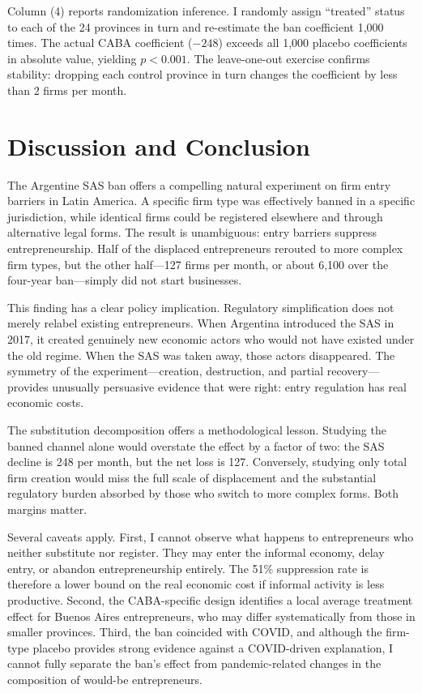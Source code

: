 \documentclass[12pt]{article}
\begin{document}
Column (4) reports randomization inference. I randomly assign ``treated'' status to each of the 24 provinces in turn and re-estimate the ban coefficient 1,000 times. The actual CABA coefficient ($-248$) exceeds all 1,000 placebo coefficients in absolute value, yielding $p < 0.001$. The leave-one-out exercise confirms stability: dropping each control province in turn changes the coefficient by less than 2 firms per month.


\section{Discussion and Conclusion}

The Argentine SAS ban offers a compelling natural experiment on firm entry barriers in Latin America. A specific firm type was effectively banned in a specific jurisdiction, while identical firms could be registered elsewhere and through alternative legal forms. The result is unambiguous: entry barriers suppress entrepreneurship. Half of the displaced entrepreneurs rerouted to more complex firm types, but the other half---127 firms per month, or about 6,100 over the four-year ban---simply did not start businesses.

This finding has a clear policy implication. Regulatory simplification does not merely relabel existing entrepreneurs. When Argentina introduced the SAS in 2017, it created genuinely new economic actors who would not have existed under the old regime. When the SAS was taken away, those actors disappeared. The symmetry of the experiment---creation, destruction, and partial recovery---provides unusually persuasive evidence that \citet{djankov2002regulation} were right: entry regulation has real economic costs.

The substitution decomposition offers a methodological lesson. Studying the banned channel alone would overstate the effect by a factor of two: the SAS decline is 248 per month, but the net loss is 127. Conversely, studying only total firm creation would miss the full scale of displacement and the substantial regulatory burden absorbed by those who switch to more complex forms. Both margins matter.

Several caveats apply. First, I cannot observe what happens to entrepreneurs who neither substitute nor register. They may enter the informal economy, delay entry, or abandon entrepreneurship entirely. The 51\% suppression rate is therefore a lower bound on the real economic cost if informal activity is less productive. Second, the CABA-specific design identifies a local average treatment effect for Buenos Aires entrepreneurs, who may differ systematically from those in smaller provinces. Third, the ban coincided with COVID, and although the firm-type placebo provides strong evidence against a COVID-driven explanation, I cannot fully separate the ban's effect from pandemic-related changes in the composition of would-be entrepreneurs.
\end{document}
